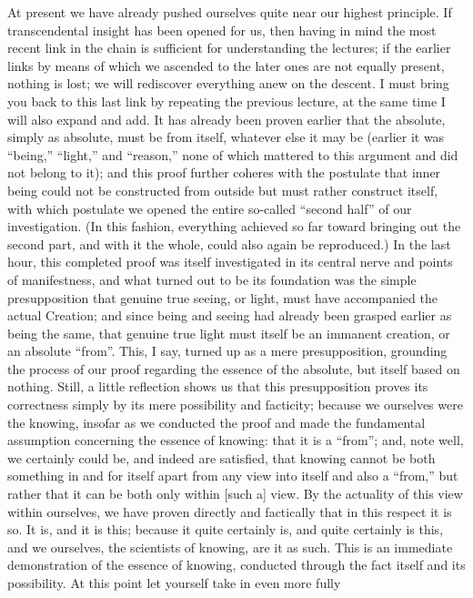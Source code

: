 At present we have already pushed ourselves
quite near our highest principle.
If transcendental insight has been opened for us,
then having in mind the most recent link in the chain is
sufficient for understanding the lectures;
if the earlier links by means of which we ascended
to the later ones are not equally present, nothing is lost;
we will rediscover everything anew on the descent.
I must bring you back to this last link by repeating
the previous lecture, at the same time I will also expand and add.
It has already been proven earlier that the absolute,
simply as absolute, must be from itself,
whatever else it may be
(earlier it was “being,” “light,” and “reason,”
none of which mattered to this argument and did not belong to it);
and this proof further coheres with the postulate
that inner being could not be constructed from
outside but must rather construct itself,
with which postulate we opened the entire
so-called “second half” of our investigation.
(In this fashion, everything achieved so far toward
bringing out the second part, and with it the whole,
could also again be reproduced.)
In the last hour, this completed proof was
itself investigated in its central nerve
and points of manifestness,
and what turned out to be its foundation was
the simple presupposition that genuine true seeing,
or light, must have accompanied the actual Creation;
and since being and seeing had already been grasped earlier
as being the same, that genuine true light must itself be
an immanent creation, or an absolute “from”.
This, I say, turned up as a mere presupposition,
grounding the process of our proof regarding
the essence of the absolute, but itself based on nothing.
Still, a little reflection shows us that
this presupposition proves its correctness
simply by its mere possibility and facticity;
because we ourselves were the knowing,
insofar as we conducted the proof
and made the fundamental assumption
concerning the essence of knowing:
that it is a “from”;
and, note well, we certainly could be,
and indeed are satisfied,
that knowing cannot be both
something in and for itself
apart from any view into itself
and also a “from,”
but rather that it can be both
only within [such a] view.
By the actuality of this view within ourselves,
we have proven directly and factically
that in this respect it is so.
It is, and it is this;
because it quite certainly is,
and quite certainly is this,
and we ourselves, the scientists of knowing,
are it as such.
This is an immediate demonstration of the essence of knowing,
conducted through the fact itself and its possibility.
At this point let yourself take in even more fully
